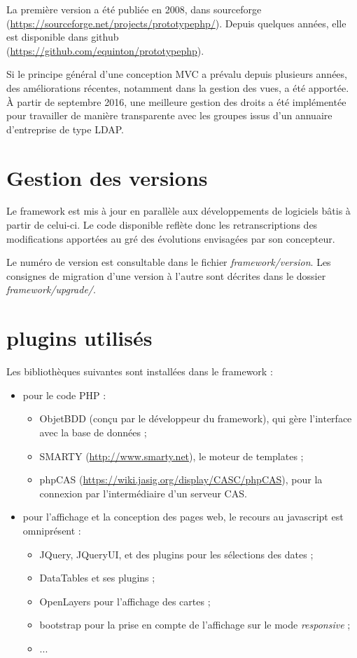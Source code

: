 La première version a été publiée en 2008, dans sourceforge \\ (\url{https://sourceforge.net/projects/prototypephp/}). Depuis quelques années, elle est disponible dans github \\(\url{https://github.com/equinton/prototypephp}).

Si le principe général d'une conception MVC a prévalu depuis plusieurs années, des améliorations récentes, notamment dans la gestion des vues, a été apportée. À partir de septembre 2016, une meilleure gestion des droits a été implémentée pour travailler de manière transparente avec les groupes issus d'un annuaire d'entreprise de type LDAP. 

\section{Gestion des versions}

Le framework est mis à jour en parallèle aux développements de logiciels bâtis à partir de celui-ci. Le code disponible reflète donc les retranscriptions des modifications apportées au gré des évolutions envisagées par son concepteur.

Le numéro de version est consultable dans le fichier \textit{framework/version}. Les consignes de migration d'une version à l'autre sont décrites dans le dossier \textit{framework/upgrade/}.

\section{plugins utilisés}
Les bibliothèques suivantes sont installées dans le framework :
\begin{itemize}
\item pour le code PHP :
\begin{itemize}
\item ObjetBDD (conçu par le développeur du framework), qui gère l'interface avec la base de données ;
\item SMARTY (\url{http://www.smarty.net}), le moteur de templates ;
\item phpCAS (\url{https://wiki.jasig.org/display/CASC/phpCAS}), pour la connexion par l'intermédiaire d'un serveur CAS.

\end{itemize}
\item pour l'affichage et la conception des pages web, le recours au javascript est omniprésent :
\begin{itemize}
\item JQuery, JQueryUI, et des plugins pour les sélections des dates ;
\item DataTables et ses plugins ;
\item OpenLayers pour l'affichage des cartes ;
\item bootstrap pour la prise en compte de l'affichage sur le mode \textit{responsive} ;
\item ...

\end{itemize}
\end{itemize}

